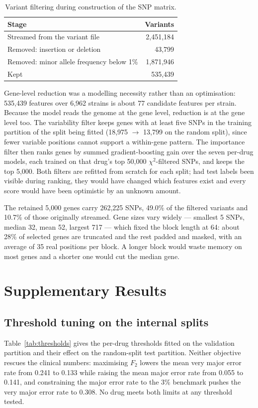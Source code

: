 \documentclass[11pt]{article}
\begin{document}
\begin{table}[t]\centering\small
\caption{Variant filtering during construction of the SNP matrix.}
\label{tab:variants}
\begin{tabular}{lr}
\toprule
Stage & Variants \\
\midrule
Streamed from the variant file & 2,451,184 \\
Removed: insertion or deletion & 43,799 \\
Removed: minor allele frequency below 1\% & 1,871,946 \\
\midrule
Kept & 535,439 \\
\bottomrule
\end{tabular}
\end{table}

Gene-level reduction was a modelling necessity rather than an optimisation: 535,439 features over
6,962 strains is about 77 candidate features per strain. Because the model reads the genome at the
gene level, reduction is at the gene level too. The variability filter keeps genes with at least
five SNPs in the training partition of the split being fitted (18,975 $\rightarrow$ 13,799 on the
random split), since fewer variable positions cannot support a within-gene pattern. The importance
filter then ranks genes by summed gradient-boosting gain over the seven per-drug models, each
trained on that drug's top 50,000 $\chi^2$-filtered SNPs, and keeps the top 5,000. Both filters are
refitted from scratch for each split; had test labels been visible during ranking, they would have
changed which features exist and every score would have been optimistic by an unknown amount.

The retained 5,000 genes carry 262,225 SNPs, 49.0\% of the filtered variants and 10.7\% of those
originally streamed. Gene sizes vary widely --- smallest 5 SNPs, median 32, mean 52, largest 717 ---
which fixed the block length at 64: about 28\% of selected genes are truncated and the rest padded
and masked, with an average of 35 real positions per block. A longer block would waste memory on
most genes and a shorter one would cut the median gene.

\section{Supplementary Results}

\subsection{Threshold tuning on the internal splits}
Table~\ref{tab:thresholds} gives the per-drug thresholds fitted on the validation partition and
their effect on the random-split test partition. Neither objective rescues the clinical numbers:
maximising $F_2$ lowers the mean very major error rate from 0.241 to 0.133 while raising the mean
major error rate from 0.055 to 0.141, and constraining the major error rate to the 3\% benchmark
pushes the very major error rate to 0.308. No drug meets both limits at any threshold tested.
\end{document}
